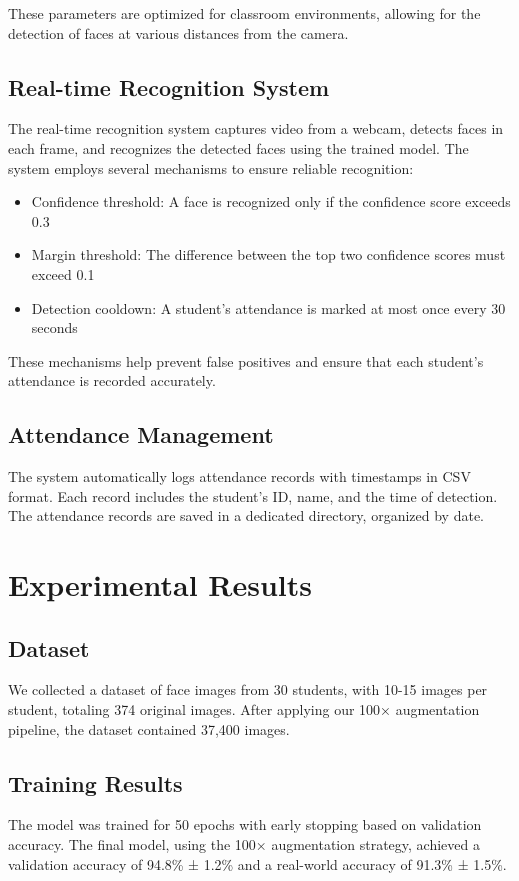 \documentclass[conference]{IEEEtran}
\begin{document}
These parameters are optimized for classroom environments, allowing for the detection of faces at various distances from the camera.

\subsection{Real-time Recognition System}
The real-time recognition system captures video from a webcam, detects faces in each frame, and recognizes the detected faces using the trained model. The system employs several mechanisms to ensure reliable recognition:

\begin{itemize}
\item Confidence threshold: A face is recognized only if the confidence score exceeds 0.3
\item Margin threshold: The difference between the top two confidence scores must exceed 0.1
\item Detection cooldown: A student's attendance is marked at most once every 30 seconds
\end{itemize}

These mechanisms help prevent false positives and ensure that each student's attendance is recorded accurately.

\subsection{Attendance Management}
The system automatically logs attendance records with timestamps in CSV format. Each record includes the student's ID, name, and the time of detection. The attendance records are saved in a dedicated directory, organized by date.

\section{Experimental Results}
\subsection{Dataset}
We collected a dataset of face images from 30 students, with 10-15 images per student, totaling 374 original images. After applying our 100× augmentation pipeline, the dataset contained 37,400 images.

\subsection{Training Results}
The model was trained for 50 epochs with early stopping based on validation accuracy. The final model, using the 100× augmentation strategy, achieved a validation accuracy of 94.8\% ± 1.2\% and a real-world accuracy of 91.3\% ± 1.5\%.
\end{document}
